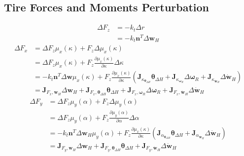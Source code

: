 \subsection{Tire Forces and Moments Perturbation}
\begin{equation}
    \begin{split}
        \Delta F_z &= -k_t \Delta r\\
        &= -k_t \mathbf{n}^T \Delta \mathbf{w}_H
    \end{split}
\end{equation}
\begin{equation}
    \begin{split}
        \Delta F_x &= \Delta F_z \mu_x(\kappa) + F_z \Delta \mu_x(\kappa)\\
        &= \Delta F_z \mu_x(\kappa) + F_z \frac{\partial{\mu_x(\kappa)}}{\partial{\kappa}} \Delta \kappa\\
        &= -k_t \mathbf{n}^T \Delta \mathbf{w} \mu_x(\kappa) + F_z \frac{\partial{\mu_x(\kappa)}}{\partial{\kappa}}\left(\mathbf{J}_{\kappa_{\boldsymbol{\theta}_{\Delta H}}}\boldsymbol{\theta}_{\Delta H} + \mathbf{J}_{\kappa_{\boldsymbol{\omega}_R}}\Delta \boldsymbol{\omega}_R + \mathbf{J}_{\kappa_{\dot{\mathbf{w}}_H}}\Delta {\dot{\mathbf{w}}}_H\right)\\
        &= \mathbf{J}_{F_x, \mathbf{w}_H} \Delta \mathbf{w}_H + \mathbf{J}_{F_x, \boldsymbol{\theta}_{\Delta H}} \boldsymbol{\theta}_{\Delta H} + \mathbf{J}_{F_x, \boldsymbol{\omega}_R} \Delta \boldsymbol{\omega}_R + \mathbf{J}_{F_x, \dot{\mathbf{w}}_H} \Delta {\dot{\mathbf{w}}}_H
    \end{split}
\end{equation}
\begin{equation}
    \begin{split}
        \Delta F_y &= \Delta F_z \mu_y(\alpha) + F_z \Delta \mu_y(\alpha)\\
        &= \Delta F_z \mu_y(\alpha) + F_z \frac{\partial{\mu_y(\alpha)}}{\partial{\alpha}} \Delta \alpha\\
        &= -k_t \mathbf{n}^T \Delta \mathbf{w}_H \mu_y(\alpha) + F_z \frac{\partial{\mu_x(\kappa)}}{\partial{\kappa}}\left(\mathbf{J}_{\alpha_{\boldsymbol{\theta}_{\Delta H}}}\boldsymbol{\theta}_{\Delta H} + \mathbf{J}_{\alpha_{\dot{\mathbf{w}}_H}}\Delta {\dot{\mathbf{w}}}_H\right)\\
        &= \mathbf{J}_{F_y, \mathbf{w}_H} \Delta \mathbf{w}_H + \mathbf{J}_{F_y, \boldsymbol{\theta}_{\Delta H}} \boldsymbol{\theta}_{\Delta H} + \mathbf{J}_{F_y, \dot{\mathbf{w}}_H} \Delta {\dot{\mathbf{w}}}_H
    \end{split}
\end{equation}
